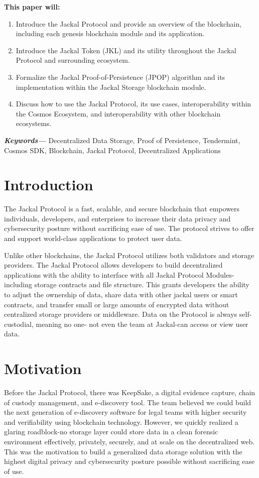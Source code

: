 \documentclass[a4paper]{article}
\providecommand{\keywords}[1]
{
  \small	
  \noindent\textbf{\textit{Keywords---}} #1
}
\providecommand{\purpose}[1]
{
  \small
  
  \textbf{This paper will:} 
  #1
}
\begin{document}
\purpose{
\begin{enumerate}
    \item Introduce the Jackal Protocol and provide an overview of the blockchain, including each genesis blockchain module and its application. 
    \item Introduce the Jackal Token (JKL) and its utility throughout the Jackal Protocol and surrounding ecosystem. 
    \item Formalize the Jackal Proof-of-Persistence (JPOP) algorithm and its implementation within the Jackal Storage blockchain module. 
    \item Discuss how to use the Jackal Protocol, its use cases, interoperability within the Cosmos Ecosystem, and interoperability with other blockchain ecosystems. 
\end{enumerate}
}

\keywords{Decentralized Data Storage, Proof of Persistence, Tendermint, Cosmos SDK, Blockchain, Jackal Protocol, Decentralized Applications}

\newpage
\tableofcontents
\newpage

\section{Introduction}
The Jackal Protocol is a fast, scalable, and secure blockchain that empowers individuals, developers, and enterprises to increase their data privacy and cybersecurity posture without sacrificing ease of use. The protocol strives to offer and support world-class applications to protect user data. 

Unlike other blockchains, the Jackal Protocol utilizes both validators and storage providers. The Jackal Protocol allows developers to build decentralized applications with the ability to interface with all Jackal Protocol Modules-including storage contracts and file structure. This grants developers the ability to adjust the ownership of data, share data with other jackal users or smart contracts, and transfer small or large amounts of encrypted data without centralized storage providers or middleware. Data on the Protocol is always self-custodial, meaning no one- not even the team at Jackal-can access or view user data. 
\section{Motivation}
Before the Jackal Protocol, there was KeepSake, a digital evidence capture, chain of custody management, and e-discovery tool. The team believed we could build the next generation of e-discovery software for legal teams with higher security and verifiability using blockchain technology. However, we quickly realized a glaring roadblock-no storage layer could store data in a clean forensic environment effectively, privately, securely, and at scale on the decentralized web. This was the motivation to build a generalized data storage solution with the highest digital privacy and cybersecurity posture possible without sacrificing ease of use. 
\end{document}
